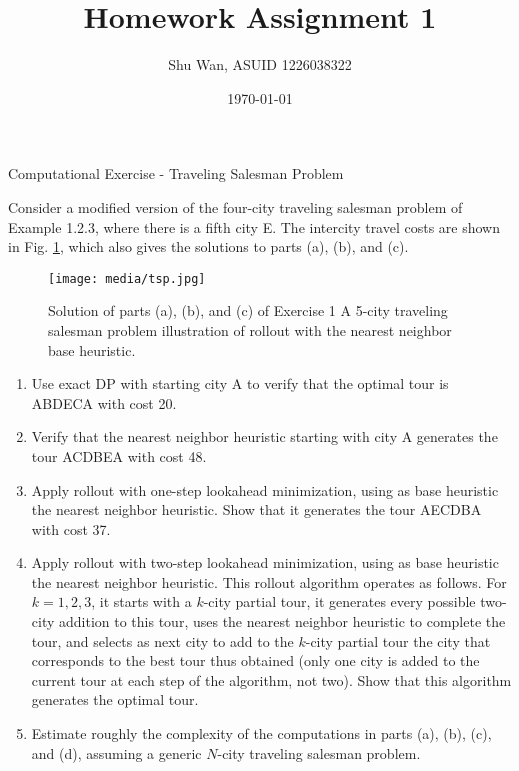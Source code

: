 \documentclass{homework}
\author{Shu Wan, ASUID 1226038322}
\date{\today}
\title{Homework Assignment 1}
\begin{document}
 \maketitle

\question Computational Exercise - Traveling Salesman Problem

Consider a modified version of the four-city traveling salesman problem of Example
1.2.3, where there is a fifth city E. The intercity travel costs are shown in
Fig. \ref{fig:1}, which also gives the solutions to parts (a), (b), and (c).

\begin{figure}[h]
    \centering
    \texttt{[image: media/tsp.jpg]}
    \caption{Solution of parts (a), (b), and (c) of Exercise 1 A 5-city traveling salesman problem illustration of rollout with the nearest neighbor base heuristic.}
    \label{fig:1}
\end{figure}

\begin{enumerate}[label=(\alph*)]
\setlength{\itemsep}{3pt}
    \item Use exact DP with starting city A to verify that the optimal tour is ABDECA
with cost 20.
\item Verify that the nearest neighbor heuristic starting with city A generates
the tour ACDBEA with cost 48.
\item Apply rollout with one-step lookahead minimization, using as base heuristic
the nearest neighbor heuristic. Show that it generates the tour AECDBA
with cost 37.

\item Apply rollout with two-step lookahead minimization, using as base heuristic
the nearest neighbor heuristic. This rollout algorithm operates as follows.
For $k = 1, 2, 3$, it starts with a $k$-city partial tour, it generates every possible
two-city addition to this tour, uses the nearest neighbor heuristic to
complete the tour, and selects as next city to add to the $k$-city partial tour
the city that corresponds to the best tour thus obtained (only one city is
added to the current tour at each step of the algorithm, not two). Show
that this algorithm generates the optimal tour.

\item Estimate roughly the complexity of the computations in parts (a), (b), (c), and (d), assuming a generic $N$-city traveling salesman problem. 
\end{enumerate}

\newpage
\end{document}
